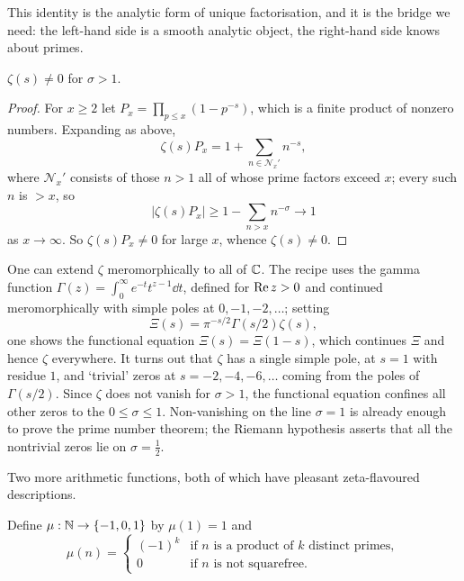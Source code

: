 \documentclass[a4paper]{scrartcl}
\begin{document}
This identity is the analytic form of unique factorisation, and it is the bridge we need: the left-hand side is a smooth analytic object, the right-hand side knows about primes.

\begin{corollary}
	$\zeta(s) \neq 0$ for $\sigma > 1$.
\end{corollary}
\begin{proof}
	For $x \geq 2$ let $P_x = \prod_{p \leq x}(1 - p^{-s})$, which is a finite product of nonzero numbers. Expanding as above,
	$$
	\zeta(s)P_x = 1 + \sum_{n \in \mathcal N_x'} n^{-s},
	$$
	where $\mathcal N_x'$ consists of those $n > 1$ all of whose prime factors exceed $x$; every such $n$ is $> x$, so
	$$
	|\zeta(s)P_x| \geq 1 - \sum_{n > x}n^{-\sigma} \longrightarrow 1
	$$
	as $x \to \infty$. So $\zeta(s)P_x \neq 0$ for large $x$, whence $\zeta(s) \neq 0$.
\end{proof}

\begin{remark}
	One can extend $\zeta$ meromorphically to all of $\mathbb{C}$. The recipe uses the gamma function $\Gamma(z) = \int_0^\infty e^{-t}t^{z-1}\dd t$, defined for $\operatorname{Re} z > 0$ and continued meromorphically with simple poles at $0, -1, -2, \dots$; setting
	$$
	\Xi(s) = \pi^{-s/2}\Gamma(s/2)\zeta(s),
	$$
	one shows the functional equation $\Xi(s) = \Xi(1 - s)$, which continues $\Xi$ and hence $\zeta$ everywhere. It turns out that $\zeta$ has a single simple pole, at $s = 1$ with residue $1$, and `trivial' zeros at $s = -2, -4, -6, \dots$ coming from the poles of $\Gamma(s/2)$. Since $\zeta$ does not vanish for $\sigma > 1$, the functional equation confines all other zeros to the  $0 \leq \sigma \leq 1$. Non-vanishing on the line $\sigma = 1$ is already enough to prove the prime number theorem; the Riemann hypothesis asserts that all the nontrivial zeros lie on $\sigma = \frac12$.
\end{remark}

Two more arithmetic functions, both of which have pleasant zeta-flavoured descriptions.

\begin{definition}
	Define $\mu : \mathbb{N} \to \{-1, 0, 1\}$ by $\mu(1) = 1$ and
	$$
	\mu(n) = \begin{cases} (-1)^k & \text{if } n \text{ is a product of } k \text{ distinct primes}, \\ 0 & \text{if } n \text{ is not squarefree}. \end{cases}
	$$
\end{definition}
\end{document}
